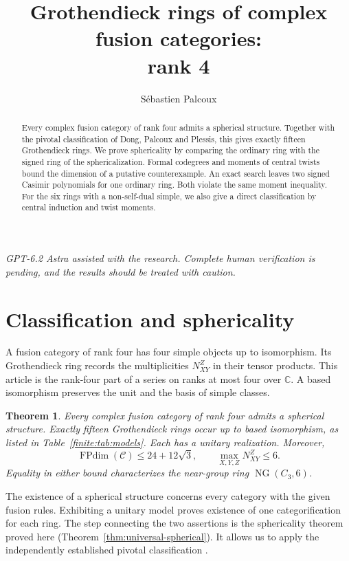 \documentclass[11pt,a4paper]{article}
\title{Grothendieck rings of complex fusion categories:\\ rank 4}
\author{Sébastien Palcoux}
\date{}
\newtheorem{theorem}{Theorem}[section]
\theoremstyle{definition}\newtheorem{definition}[theorem]{Definition}
\theoremstyle{remark}\newtheorem{remark}[theorem]{Remark}
\DeclareMathOperator{\FPdim}{FPdim}
\newcommand{\C}{\mathcal C}
\newcommand{\CC}{\mathbb C}
\numberwithin{equation}{section}
\begin{document}
\raggedbottom
\maketitle
\begin{abstract}
Every complex fusion category of rank four admits a spherical structure.
Together with the pivotal classification of Dong, Palcoux and Plessis,
this gives exactly fifteen Grothendieck rings. We prove sphericality by
comparing the ordinary ring with the signed ring of the sphericalization.
Formal codegrees and moments of central twists bound the dimension of a
putative counterexample. An exact search leaves two signed Casimir
polynomials for one ordinary ring. Both violate the same moment inequality.
For the six rings with a non-self-dual simple, we also give a direct
classification by central induction and twist moments.
\end{abstract}
\par\smallskip
\begin{center}\begin{minipage}{0.88\linewidth}\small\itshape
GPT-6.2 Astra assisted with the research. Complete human verification is
pending, and the results should be treated with caution.
\end{minipage}\end{center}
\tableofcontents
\section{Classification and sphericality}\label{sec:introduction}
A fusion category of rank four has four simple objects up to isomorphism.
Its Grothendieck ring records the multiplicities $N_{XY}^Z$ in their tensor
products. This article is the rank-four part of a series on ranks at most four over
$\CC$. A based isomorphism preserves the unit and the basis of simple classes.

\begin{theorem}\label{thm:classification}
Every complex fusion category of rank four admits a spherical structure.
Exactly fifteen Grothendieck rings occur up to based isomorphism, as listed
in Table~\ref{finite:tab:models}. Each has a unitary realization. Moreover,
\[
 \FPdim(\C)\le24+12\sqrt3,\qquad \max_{X,Y,Z}N_{XY}^Z\le6 .
\]
Equality in either bound characterizes the near-group ring
$\operatorname{NG}(C_3,6)$.
\end{theorem}

The existence of a spherical structure concerns every category with the
given fusion rules. Exhibiting a unitary model proves existence of one
categorification for each ring. The step connecting the two assertions
is the sphericality theorem proved here (Theorem~\ref{thm:universal-spherical}).
It allows us to apply the independently established pivotal classification
\cite[Theorem~1.1 and Table~1]{DPP}.
\end{document}
